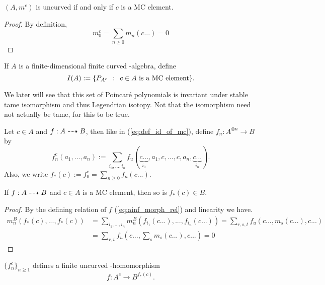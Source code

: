 \begin{lemma}
$(A,m^c)$ is uncurved if and only if $c$ is a MC element.
\end{lemma}

\begin{proof}
By definition,
\[ m_0^c = \sum_{n \ge 0} m_n(c...) = 0 \]
\end{proof}

\begin{defn}
If $A$ is a finite-dimensional finite curved \Ainf-algebra, define 
\[ I(A) := \{ P_{A^c} \:\::\:\: c \in A \text{ is a MC element} \}. \]
\end{defn}

We later will see that this set of Poincar\'{e} polynomials is invariant under
stable tame isomorphism and thus Legendrian isotopy. Not that the isomorphism
need not actually be tame, for this to be true. 

\begin{defn}
\label{def:hom_c}
Let $c \in A$ and $f: A \dashrightarrow B$, then like in (\ref{eq:def_id_of_mc}), define
$f_n : A^{\otimes n} \to B$ by
\begin{equation}
\label{eq:hom_c}
f^c_n(a_1,...,a_n) := \sum_{i_0,...,i_n}
f_u(\underbrace{c...}_{i_0},a_1,c,...,c,a_n,\underbrace{c...}_{i_n}).
\end{equation}
Also, we write $f_*(c) := f_0^c = \sum_{n\ge 0} f_n(c...)$.
\end{defn}

\begin{lemma}
If $f: A \dashrightarrow B$ and $c\in A$ is a MC element, then so is $f_*(c) \in B$.
\end{lemma}
\begin{proof}
By the defining relation of $f$ (\ref{eq:ainf_morph_rel}) and linearity we
have.
\begin{align*}
m^B_n(f_*(c), ..., f_*(c)) 
&= \sum_{i_1,...,i_n} m^B_n(f_{i_1}(c...), ..., f_{i_n}(c...)) 
= \sum_{r,s,t} f_u(c..., m_s(c...), c...)  \\
&= \sum_{r,t} f_u(c..., \sum_s m_s(c...), c...)  = 0
\end{align*}
\end{proof}

\begin{lemma}
$\{ f^c_n \}_{n \ge 1}$ defines a finite uncurved \Ainf-homomorphism 
\[ f: A^c \to B^{f_*(c)}. \]
\end{lemma} 

